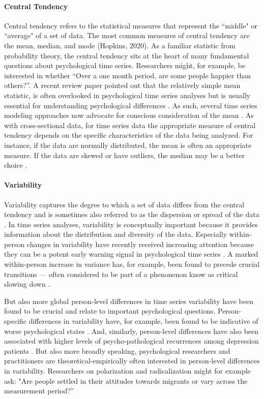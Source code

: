 \documentclass[man, 12pt, a4paper, mask, floatsintext]{apa7}
\theoremstyle{break}
\theoremstyle{plain}
\begin{document}
\paragraph{Central Tendency} Central tendency refers to the statistical measures that represent the ``middle" or ``average" of a set of data. The most common measures of central tendency are the mean, median, and mode (Hopkins, 2020). As a familiar statistic from probability theory, the central tendency sits at the heart of many fundamental questions about psychological time series. Researchers might, for example, be interested in whether ``Over a one month period, are some people happier than others?''. A recent review paper pointed out that the relatively simple mean statistic, is often overlooked in psychological time series analyses but is usually essential for understanding psychological differences \citep{bringmann2018c}. As such, several time series modeling approaches now advocate for conscious consideration of the mean \citep[e.g.,][]{bringmann2017a}. As with cross-sectional data, for time series data the appropriate measure of central tendency depends on the specific characteristics of the data being analyzed. For instance, if the data are normally distributed, the mean is often an appropriate measure. If the data are skewed or have outliers, the median may be a better choice \citep{weisberg1992}.

\paragraph{Variability} Variability captures the degree to which a set of data differs from the central tendency and is sometimes also referred to as the dispersion or spread of the data \citep{weisberg1992}. In time series analyses, variability is conceptually important because it provides information about the distribution and diversity of the data. Especially within-person changes in variability have recently received increasing attention because they can be a potent early warning signal in psychological time series \citep{helmich2020a, vandeleemput2014}. A marked within-person increase in variance has, for example, been found to precede crucial transitions --- often considered to be part of a phenonenon know as critical slowing down \citep[i.e., anomalous variances; e.g.,][]{scheffer2009, wichers2019}. 

But also more global person-level differences in time series variability have been found to be crucial and relate to important psychological questions. Person-specific differences in variability have, for example, been found to be indicative of worse psychological states \citep{myin-germeys2018}. And, similarly, person-level differences have also been associated with higher levels of psycho-pathological recurrences among depression patients \citep{timm2017}. But also more broadly speaking, psychological researchers and practitioners are theoretical-empirically often interested in person-level differences in variability. Researchers on polarization and radicalization might for example ask: "Are people settled in their attitudes towards migrants or vary across the measurement period?''
\end{document}
